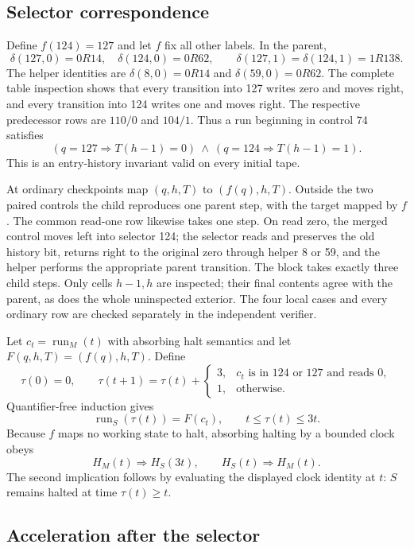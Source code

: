 \subsection{Selector correspondence}

Define $f(124)=127$ and let $f$ fix all other labels. In the parent,
\[
 \delta(127,0)=0R14,\quad \delta(124,0)=0R62,\qquad
 \delta(127,1)=\delta(124,1)=1R138.
\]
The helper identities are $\delta(8,0)=0R14$ and
$\delta(59,0)=0R62$. The complete table inspection shows that every
transition into 127 writes zero and moves right, and every transition into
124 writes one and moves right. The respective predecessor rows are
$110/0$ and $104/1$. Thus a run beginning in control 74 satisfies
\[
 (q=127\Rightarrow T(h-1)=0)\ \land\
 (q=124\Rightarrow T(h-1)=1).
\]
This is an entry-history invariant valid on every initial tape.

At ordinary checkpoints map $(q,h,T)$ to $(f(q),h,T)$. Outside the two
paired controls the child reproduces one parent step, with the target
mapped by $f$. The common read-one row likewise takes one step. On read
zero, the merged control moves left into selector 124; the selector reads
and preserves the old history bit, returns right to the original zero
through helper 8 or 59, and the helper performs the appropriate parent
transition. The block takes exactly three child steps. Only cells $h-1,h$
are inspected; their final contents agree with the parent, as does the
whole uninspected exterior. The four local cases and every ordinary row
are checked separately in the independent verifier.

Let $c_t=\operatorname{run}_M(t)$ with absorbing halt semantics and let
$F(q,h,T)=(f(q),h,T)$. Define
\[
 \tau(0)=0,\qquad \tau(t+1)=\tau(t)+
 \begin{cases}3,&c_t\text{ is in }124\text{ or }127\text{ and reads }0,\\
 1,&\text{otherwise}.\end{cases}
\]
Quantifier-free induction gives
\[
 \operatorname{run}_S(\tau(t))=F(c_t),\qquad
 t\leq\tau(t)\leq3t.
\]
Because $f$ maps no working state to halt, absorbing halting by a bounded
clock obeys
\[
 H_M(t)\Longrightarrow H_S(3t),\qquad
 H_S(t)\Longrightarrow H_M(t).                 \tag{SF1}
\]
The second implication follows by evaluating the displayed clock identity
at $t$: $S$ remains halted at time $\tau(t)\geq t$.

\subsection{Acceleration after the selector}

